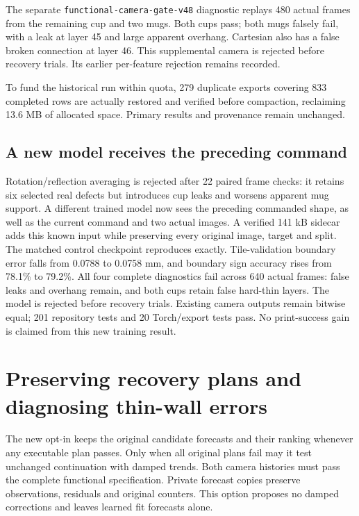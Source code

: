 \documentclass[10pt,letterpaper]{article}
\newcommand{\code}[1]{\texttt{\detokenize{#1}}}
\begin{document}
The separate \texttt{functional-camera-gate-v48} diagnostic replays 480 actual
frames from the remaining cup and two mugs. Both cups pass; both mugs falsely
fail, with a leak at layer 45 and large apparent overhang. Cartesian also has a
false broken connection at layer 46. This supplemental camera is rejected before
recovery trials. Its earlier per-feature rejection remains recorded.

To fund the historical run within quota, 279 duplicate exports covering 833
completed rows are actually restored and verified before compaction, reclaiming
13.6 MB of allocated space. Primary results and provenance remain unchanged.

\subsection*{A new model receives the preceding command}
Rotation/reflection averaging is rejected after 22 paired frame checks: it
retains six selected real defects but introduces cup leaks and worsens apparent
mug support. A different trained model now sees the preceding commanded shape,
as well as the current command and two actual images. A verified 141 kB sidecar
adds this known input while preserving every original image, target and split.
The matched control checkpoint reproduces exactly. Tile-validation boundary
error falls from 0.0788 to 0.0758 mm, and boundary sign accuracy rises from
78.1\% to 79.2\%. All four complete diagnostics fail across 640 actual frames:
false leaks and overhang remain, and both cups retain false hard-thin layers.
The model is rejected before recovery trials. Existing camera outputs remain bitwise equal;
201 repository tests and 20 Torch/export tests pass. No print-success gain is
claimed from this new training result.

\clearpage
\section{Preserving recovery plans and diagnosing thin-wall errors}

The new opt-in \code{--boundary-trend-continuation-fallback} keeps the original
candidate forecasts and their ranking whenever any executable plan passes.
Only when all original plans fail may it test unchanged continuation with damped
trends. Both camera histories must pass the complete functional specification.
Private forecast copies preserve observations, residuals and original counters.
This option proposes no damped corrections and leaves learned fit forecasts alone.
\end{document}
